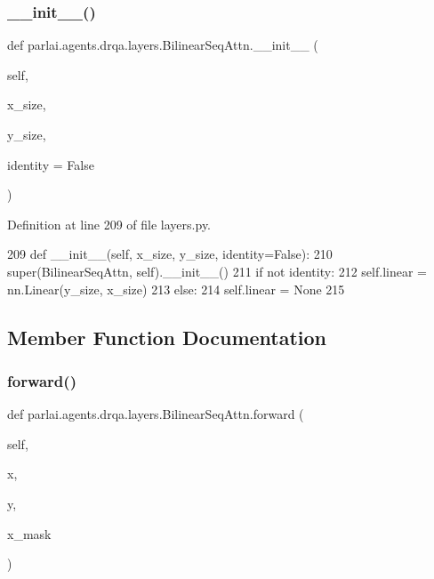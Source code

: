 \subsubsection{\texorpdfstring{\+\_\+\+\_\+init\+\_\+\+\_\+()}{\_\_init\_\_()}}
{\footnotesize\ttfamily def parlai.\+agents.\+drqa.\+layers.\+Bilinear\+Seq\+Attn.\+\_\+\+\_\+init\+\_\+\+\_\+ (\begin{DoxyParamCaption}\item[{}]{self,  }\item[{}]{x\+\_\+size,  }\item[{}]{y\+\_\+size,  }\item[{}]{identity = {\ttfamily False} }\end{DoxyParamCaption})}



Definition at line 209 of file layers.\+py.


\begin{DoxyCode}
209     \textcolor{keyword}{def }\_\_init\_\_(self, x\_size, y\_size, identity=False):
210         super(BilinearSeqAttn, self).\_\_init\_\_()
211         \textcolor{keywordflow}{if} \textcolor{keywordflow}{not} identity:
212             self.linear = nn.Linear(y\_size, x\_size)
213         \textcolor{keywordflow}{else}:
214             self.linear = \textcolor{keywordtype}{None}
215 
\end{DoxyCode}


\subsection{Member Function Documentation}
\mbox{\label{classparlai_1_1agents_1_1drqa_1_1layers_1_1BilinearSeqAttn_af6775803498ad914cd5e74cd228927e6}} 
\subsubsection{\texorpdfstring{forward()}{forward()}}
{\footnotesize\ttfamily def parlai.\+agents.\+drqa.\+layers.\+Bilinear\+Seq\+Attn.\+forward (\begin{DoxyParamCaption}\item[{}]{self,  }\item[{}]{x,  }\item[{}]{y,  }\item[{}]{x\+\_\+mask }\end{DoxyParamCaption})}

